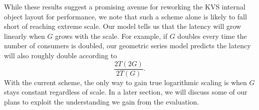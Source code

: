 While these results suggest a promising avenue for reworking the KVS internal
object layout for performance, we note that such a scheme alone
is likely to fall short of reaching extreme scale.
Our model tells us that the latency will grow linearly when $G$ grows
with the scale.   For example, if $G$ doubles every time the number of
consumers is doubled, our geometric series model predicts the latency will
also roughly double according to
\begin{equation}
\frac{2T(2G)}{2T(G)}.
\end{equation}
With the current scheme, the only way to gain true logarithmic
scaling is when $G$ stays constant regardless of scale. 
In a later section, we will discuss some of our plans 
to exploit the understanding we gain from the evaluation. 
